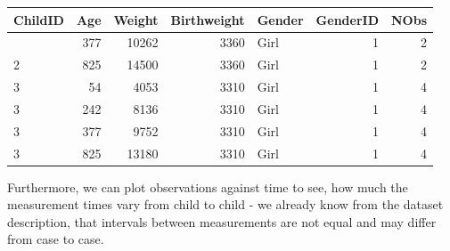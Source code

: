 \documentclass[
  12pt,
]{article}
\newenvironment{Shaded}{\begin{snugshade}}{\end{snugshade}}
\newcommand{\AttributeTok}[1]{\textcolor[rgb]{0.13,0.29,0.53}{#1}}
\newcommand{\CommentTok}[1]{\textcolor[rgb]{0.56,0.35,0.01}{\textit{#1}}}
\newcommand{\DecValTok}[1]{\textcolor[rgb]{0.00,0.00,0.81}{#1}}
\newcommand{\FunctionTok}[1]{\textcolor[rgb]{0.13,0.29,0.53}{\textbf{#1}}}
\newcommand{\NormalTok}[1]{#1}
\newcommand{\OtherTok}[1]{\textcolor[rgb]{0.56,0.35,0.01}{#1}}
\newcommand{\SpecialCharTok}[1]{\textcolor[rgb]{0.81,0.36,0.00}{\textbf{#1}}}
\newcommand{\StringTok}[1]{\textcolor[rgb]{0.31,0.60,0.02}{#1}}
\begin{document}
\begin{Shaded}
\end{Shaded}

\begin{longtable}[]{@{}lrrrlrr@{}}
\toprule\noalign{}
ChildID & Age & Weight & Birthweight & Gender & GenderID & NObs \\
\midrule\noalign{}
\endhead
\bottomrule\noalign{}
\endlastfoot
2 & 377 & 10262 & 3360 & Girl & 1 & 2 \\
2 & 825 & 14500 & 3360 & Girl & 1 & 2 \\
3 & 54 & 4053 & 3310 & Girl & 1 & 4 \\
3 & 242 & 8136 & 3310 & Girl & 1 & 4 \\
3 & 377 & 9752 & 3310 & Girl & 1 & 4 \\
3 & 825 & 13180 & 3310 & Girl & 1 & 4 \\
\end{longtable}

Furthermore, we can plot observations against time to see, how much the
measurement times vary from child to child - we already know from the
dataset description, that intervals between measurements are not equal
and may differ from case to case.
\end{document}
